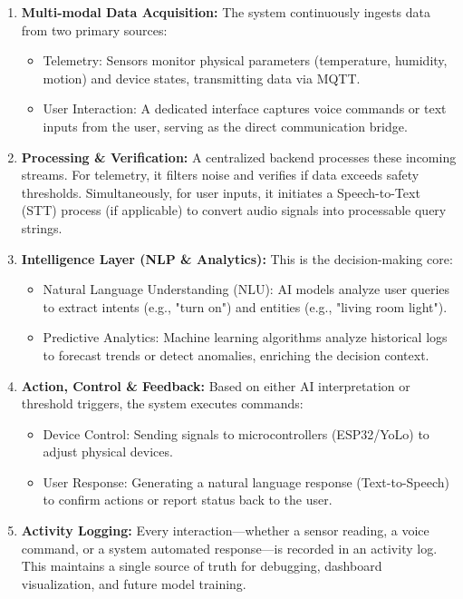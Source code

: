 \begin{enumerate}
  \item \textbf{Multi-modal Data Acquisition:}
    The system continuously ingests data from two primary sources:
    \begin{itemize}
      \item  Telemetry: Sensors monitor physical parameters (temperature, humidity, motion) and device states, transmitting data via MQTT.
      \item User Interaction: A dedicated interface captures voice commands or text inputs from the user, serving as the direct communication bridge.
    \end{itemize}

  \item \textbf{Processing \& Verification:}
    A centralized backend processes these incoming streams. For telemetry, it filters noise and verifies if data exceeds safety thresholds. Simultaneously, for user inputs, it initiates a Speech-to-Text (STT) process (if applicable) to convert audio signals into processable query strings.

  \item \textbf{Intelligence Layer (NLP \& Analytics):}
    This is the decision-making core:
    \begin{itemize}
      \item Natural Language Understanding (NLU): AI models analyze user queries to extract intents (e.g., "turn on") and entities (e.g., "living room light").
      \item Predictive Analytics: Machine learning algorithms analyze historical logs to forecast trends or detect anomalies, enriching the decision context.
    \end{itemize}

  \item \textbf{Action, Control \& Feedback:}
    Based on either AI interpretation or threshold triggers, the system executes commands:
    \begin{itemize}
      \item Device Control: Sending signals to microcontrollers (ESP32/YoLo) to adjust physical devices.
      \item User Response: Generating a natural language response (Text-to-Speech) to confirm actions or report status back to the user.
    \end{itemize}

  \item \textbf{Activity Logging:}
    Every interaction—whether a sensor reading, a voice command, or a system automated response—is recorded in an activity log. This maintains a single source of truth for debugging, dashboard visualization, and future model training.
\end{enumerate}

